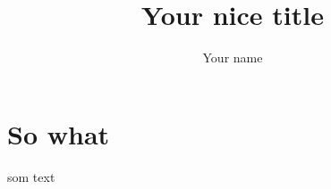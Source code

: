 \documentclass{apaKadu}
\title{Your nice title}
\author{Your name}
\affiliation{Your university}
\begin{document}
\maketitle

\section{So what}

som text

\printbibliography
\end{document}

